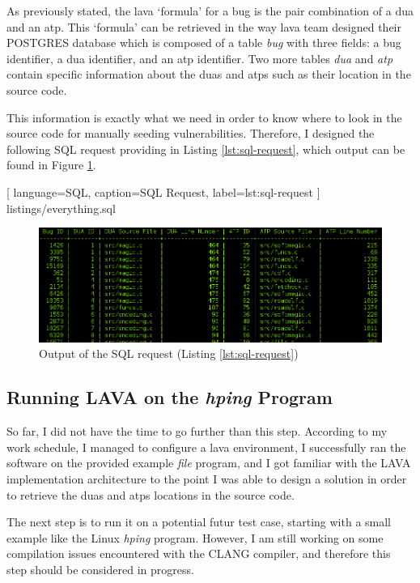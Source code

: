 As previously stated, the \gls{lava} `formula' for a bug is the pair combination of a \gls{dua} and an \gls{atp}. This `formula' can be retrieved in the way \gls{lava} team designed their POSTGRES database which is composed of a table \emph{bug} with three fields: a bug identifier, a \gls{dua} identifier, and an \gls{atp} identifier. Two more tables \emph{dua} and \emph{atp} contain specific information about the \glspl{dua} and \glspl{atp} such as their location in the source code.

This information is exactly what we need in order to know where to look in the source code for manually seeding vulnerabilities. Therefore, I designed the following SQL request providing in Listing \ref{lst:sql-request}, which output can be found in Figure \ref{fig:sql-output}.

\vspace{0.5cm}


    [
        language=SQL,
        caption=SQL Request,
        label=lst:sql-request
    ]
    {listings/everything.sql}

\begin{figure}[ht]
    \centering
    \includegraphics[scale=0.5]{figures/sql-output}
    \caption{Output of the SQL request (Listing \ref{lst:sql-request})}
    \label{fig:sql-output}
\end{figure}

\subsection{Running LAVA on the \emph{hping} Program}

So far, I did not have the time to go further than this step. According to my work schedule, I managed to configure a \gls{lava} environment, I successfully ran the software on the provided example \emph{file} program, and I got familiar with the LAVA implementation architecture to the point I was able to design a solution in order to retrieve the \glspl{dua} and \glspl{atp} locations in the source code.

The next step is to run it on a potential futur test case, starting with a small example like the Linux \emph{hping} program. However, I am still working on some compilation issues encountered with the CLANG compiler, and therefore this step should be considered in progress.